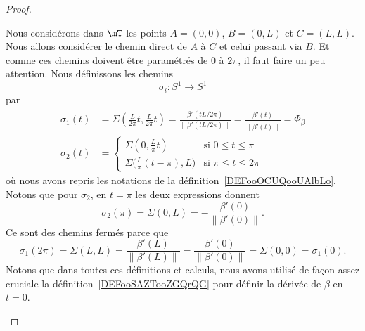 \begin{proof}
\begin{subproof}
		Nous considérons dans \( \mT\) les points \( A=(0,0)\), \( B=(0,L)\) et \( C=(L,L)\). Nous allons considérer le chemin direct de \( A\) à \( C\) et celui passant via \( B\). Et comme ces chemins doivent être paramétrés de \( 0\) à \( 2 \pi\), il faut faire un peu attention. Nous définissons les chemins
		\begin{equation}
			\sigma_i\colon S^1\to S^1
		\end{equation}
		par
		\begin{subequations}
			\begin{align}
				\sigma_1(t) & =\Sigma\left( \frac{ L }{ 2\pi }t,\frac{ L }{ 2\pi }t \right)=\frac{ \beta'(tL/2\pi) }{ \| \beta'(tL/2\pi) \| }=\frac{ \tilde \beta'(t) }{ \|\tilde  \beta'(t) \| }=\Phi_{\beta} \\
				\sigma_2(t) & =\begin{cases}
					               \Sigma(0,\frac{ L }{ \pi }t)                  & \text{si } 0\leq t\leq \pi   \\
					               \Sigma\big( \frac{ L }{ \pi }(t-\pi),L  \big) & \text{si }\pi\leq t\leq 2\pi
				               \end{cases}
			\end{align}
		\end{subequations}
		où nous avons repris les notations de la définition~\ref{DEFooOCUQooUAlbLo}. Notons que pour \( \sigma_2\), en \( t=\pi\) les deux expressions donnent
		\begin{equation}
			\sigma_2(\pi)=\Sigma(0,L)=-\frac{ \beta'(0) }{ \| \beta'(0) \| }.
		\end{equation}
		Ce sont des chemins fermés parce que
		\begin{equation}
			\sigma_1(2\pi)=\Sigma(L,L)=\frac{ \beta'(L) }{ \| \beta'(L) \| }=\frac{ \beta'(0) }{ \| \beta'(0) \| }=\Sigma(0,0)=\sigma_1(0).
		\end{equation}
		Notons que dans toutes ces définitions et calculs, nous avons utilisé de façon assez cruciale la définition~\ref{DEFooSAZTooZGQrQG} pour définir la dérivée de \( \beta\) en \( t=0\).


\end{subproof}
\end{proof}
